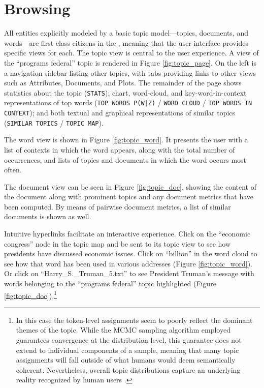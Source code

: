 \documentclass[11pt]{article}
\begin{document}
\section{Browsing}
All entities explicitly modeled by a basic topic model---topics, documents,
and words---are first-class citizens in the \tool, meaning that the user
interface provides specific views for each. The topic view
is central to the user experience. A view of the ``programs federal'' topic is
rendered in Figure \ref{fig:topic_page}. On the left is a navigation sidebar listing other topics,
with tabs providing links to other views such as Attributes, Documents, and Plots.
The remainder of the page shows statistics about the topic
(\texttt{STATS}); chart, word-cloud, and key-word-in-context representations of top
words (\texttt{TOP WORDS P(W|Z)} / \texttt{WORD CLOUD} / \texttt{TOP WORDS IN CONTEXT}); and
both textual and graphical representations of similar topics (\texttt{SIMILAR
TOPICS} / \texttt{TOPIC MAP}).

The word view is shown in Figure \ref{fig:topic_word}. It presents the user with
a list of contexts in which the word appears, along with the total number of
occurrences, and lists of topics and documents in which the word occurs most
often. 

The document view can be seen in Figure \ref{fig:topic_doc}, showing the content
of the document along with prominent topics and any document metrics that have been computed. By
means of pairwise document metrics, a list of similar documents is shown as
well.

Intuitive hyperlinks facilitate an interactive experience. Click on the %
``economic congress'' node in the topic map and be sent to its topic view
to see how presidents have discussed economic issues. Click on ``billion'' in
the word cloud to see how that word has been used in various addresses (Figure
\ref{fig:topic_word}). Or click on ``Harry\_S.\_Truman\_5.txt'' to see
President Truman's message with words belonging to the ``programs federal''
topic highlighted (Figure \ref{fig:topic_doc}).\footnote{In this case the token-level
assignments seem to poorly reflect the dominant themes of the topic. While
the MCMC sampling algorithm employed guarantees convergence at the distribution
level, this guarantee does not extend to individual components of a sample,
meaning that many topic assignments will fall outside of what humans would deem
semantically coherent. Nevertheless, overall topic distributions capture
an underlying reality recognized by human users \cite{Chang2009}.}
\end{document}
